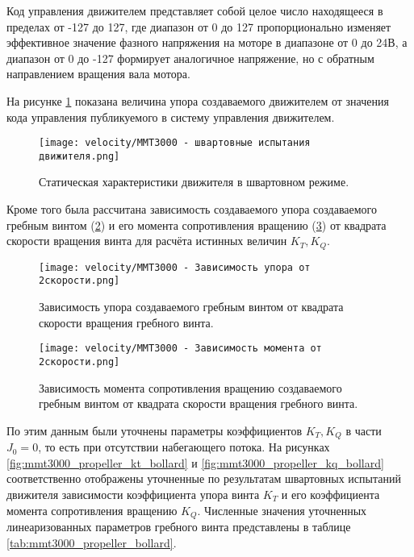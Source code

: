 Код управления движителем представляет собой целое число находящееся в пределах от -127 до 127, где диапазон от 0 до 127 пропорционально изменяет эффективное значение фазного напряжения на моторе в диапазоне от 0 до 24В, а диапазон от 0 до -127 формирует аналогичное напряжение, но с обратным направлением вращения вала мотора.

На рисунке \ref{fig:mmt3000_bollardpul} показана величина упора создаваемого движителем от значения кода управления публикуемого в систему управления движителем.
\begin{figure}[ht]
    \centering
    \texttt{[image: velocity/MMT3000 - швартовные испытания движителя.png]}
    \caption{Статическая характеристики движителя в швартовном режиме.}
    \label{fig:mmt3000_bollardpul}
\end{figure}

Кроме того была рассчитана зависимость создаваемого упора создаваемого гребным винтом (\ref{fig:mmt3000_thrust_rotation2}) и его момента сопротивления вращению (\ref{fig:mmt3000_torque_rotation2}) от квадрата скорости вращения винта для расчёта истинных величин $K_T,K_Q$.

\begin{figure}[ht]
    \centering
    \texttt{[image: velocity/MMT3000 - Зависимость упора от 2скорости.png]}
    \caption{Зависимость упора создаваемого гребным винтом от квадрата скорости вращения гребного винта.}
    \label{fig:mmt3000_thrust_rotation2}
\end{figure}

\begin{figure}[ht]
    \centering
    \texttt{[image: velocity/MMT3000 - Зависимость момента от 2скорости.png]}
    \caption{Зависимость момента сопротивления вращению создаваемого гребным винтом от квадрата скорости вращения гребного винта.}
    \label{fig:mmt3000_torque_rotation2}
\end{figure}

По этим данным были уточнены параметры коэффициентов $K_T, K_Q$ в части $J_0 = 0$, то есть при отсутствии набегающего потока.
На рисунках \ref{fig:mmt3000_propeller_kt_bollard} и \ref{fig:mmt3000_propeller_kq_bollard} соответственно отображены уточненные по результатам швартовных испытаний движителя зависимости коэффициента упора винта $K_T$ и его коэффициента момента сопротивления вращению $K_Q$.
Численные значения уточненных линеаризованных параметров гребного винта представлены в таблице \ref{tab:mmt3000_propeller_bollard}.

